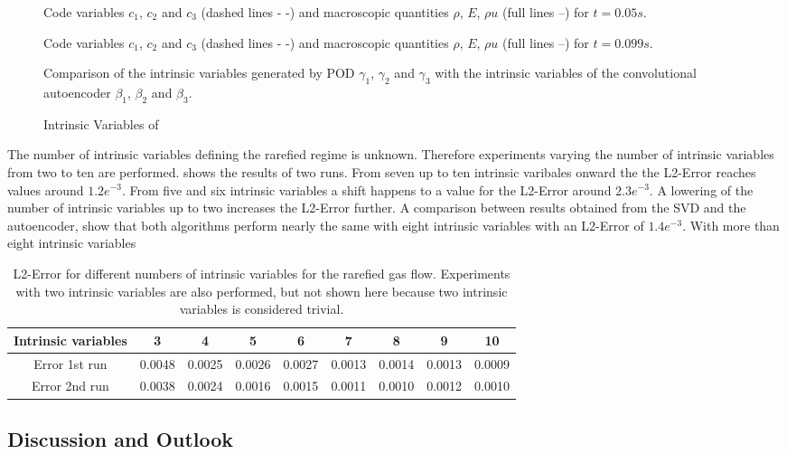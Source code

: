 \begin{figure}[!htbp]
	\scalebox{1}{}
	\caption{Code variables \(c_1\), \(c_2\) and \(c_3\) (dashed lines - -) and macroscopic quantities \(\rho\), \(E\), \(\rho u\) (full lines --) for \(t=0.05s\).}
\end{figure}
\begin{figure}[!htbp]
	\scalebox{1}{}
	\caption{Code variables \(c_1\), \(c_2\) and \(c_3\) (dashed lines - -) and macroscopic quantities \(\rho\), \(E\), \(\rho u\) (full lines --) for \(t=0.099s\).}
\end{figure}
\begin{figure}[!htbp]
	\scalebox{.6}{}
	\caption{Comparison of the intrinsic variables generated by POD \(\gamma_1\), \(\gamma_2\) and \(\gamma_3\) with the intrinsic variables of the convolutional autoencoder \(\beta_1\), \(\beta_2\) and \(\beta_3\).}
\end{figure}

\begin{figure}[!hp]
	\scalebox{0.9}{}
	\caption{Intrinsic Variables of \rare}
\end{figure}
The number of intrinsic variables defining the rarefied regime is unknown. Therefore experiments varying the number of intrinsic variables from two to ten are performed.  shows the results of two runs. From seven up to ten intrinsic varibales onward the the L2-Error reaches values around \(1.2e^{-3}\). From five and six intrinsic variables a shift happens to a value for the L2-Error around \(2.3e^{-3}\). A lowering of the number of intrinsic variables up to two increases the L2-Error further. A comparison between results obtained from the SVD and the autoencoder, show that both algorithms perform nearly the same with eight intrinsic variables with an L2-Error of \(1.4e^{-3}\). With more than eight intrinsic variables  
\begin{table}[!htbp]\centering
	\begin{tabular}{ |c|c|c|c|c|c|c|c|c| }
		\hline
		Intrinsic variables  & 3 & 4 & 5 & 6 & 7 & 8 & 9 & 10 \\ [.5ex]
		\hline
		Error 1st run & 0.0048 & 0.0025 & 0.0026 & 0.0027 & 0.0013 & 0.0014 & 0.0013 & 0.0009\\ \hline
		Error 2nd run & 0.0038 & 0.0024 & 0.0016 & 0.0015 & 0.0011 & 0.0010 & 0.0012 & 0.0010\\\hline
	\end{tabular}
	\caption{L2-Error for different numbers of intrinsic variables for the rarefied gas flow. Experiments with two intrinsic variables are also performed, but not shown here because two intrinsic variables is considered trivial.}
	\label{Tab:Intrinsic units}
\end{table}
\subsection{Discussion and Outlook}